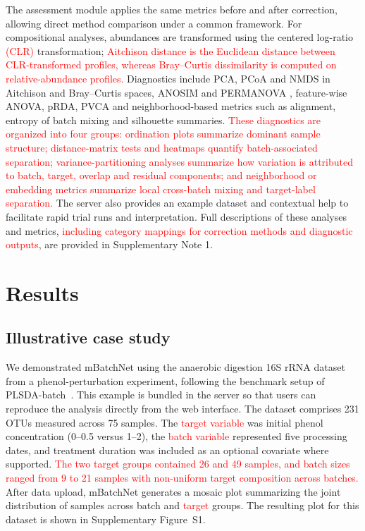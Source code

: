 \documentclass[webpdf,contemporary,large,numbered]{oup-authoring-template}
\providecommand{\rev}[1]{\textcolor{red}{#1}}
\begin{document}
The assessment module applies the same metrics before and after correction, allowing direct method comparison under a common framework. For compositional analyses, abundances are transformed using the centered log-ratio \rev{(CLR)} transformation; \rev{Aitchison distance is the Euclidean distance between CLR-transformed profiles, whereas Bray--Curtis dissimilarity is computed on relative-abundance profiles.} Diagnostics include PCA, PCoA and NMDS in Aitchison and Bray--Curtis spaces, ANOSIM \citep{Clarke1993ANOSIM} and PERMANOVA \citep{Anderson2001PERMANOVA}, feature-wise ANOVA, pRDA, PVCA and neighborhood-based metrics such as alignment, entropy of batch mixing and silhouette summaries. \rev{These diagnostics are organized into four groups: ordination plots summarize dominant sample structure; distance-matrix tests and heatmaps quantify batch-associated separation; variance-partitioning analyses summarize how variation is attributed to batch, target, overlap and residual components; and neighborhood or embedding metrics summarize local cross-batch mixing and target-label separation.} The server also provides an example dataset and contextual help to facilitate rapid trial runs and interpretation.
Full descriptions of these analyses and metrics, \rev{including category mappings for correction methods and diagnostic outputs}, are provided in Supplementary Note 1.


\section{Results}
\subsection{Illustrative case study}
We demonstrated mBatchNet using the anaerobic digestion 16S rRNA dataset from a phenol-perturbation experiment, following the benchmark setup of PLSDA-batch~\citep{Chapleur2016Phenol,Wang2023PLSDABatch}. This example is bundled in the server so that users can reproduce the analysis directly from the web interface. The dataset comprises 231 OTUs measured across 75 samples. The \rev{target variable} was initial phenol concentration (0--0.5 versus 1--2), the \rev{batch variable} represented five processing dates, and treatment duration was included as an optional covariate where supported. \rev{The two target groups contained 26 and 49 samples, and batch sizes ranged from 9 to 21 samples with non-uniform target composition across batches.} After data upload, mBatchNet generates a mosaic plot summarizing the joint distribution of samples across batch and \rev{target} groups. The resulting plot for this dataset is shown in Supplementary Figure~S1.
\end{document}

